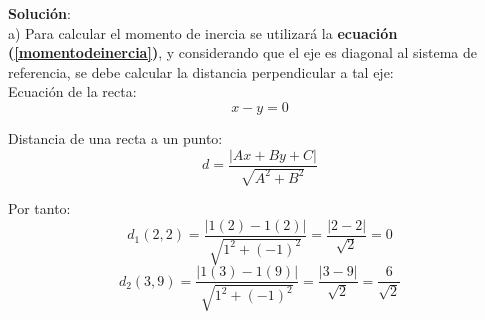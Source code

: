 \documentclass[letter,twoside,11pt]{article}
\begin{document}
\begin{minipage}[b]{.9\linewidth}
\textbf{Solución}:\\
a) Para calcular el momento de inercia se utilizará la \textbf{ecuación
(\ref{momentodeinercia})}, y considerando que el eje es diagonal al sistema de
referencia, se debe calcular la distancia perpendicular a tal eje: \\

Ecuación de la recta:
\begin{equation*}
    x - y = 0
\end{equation*}

Distancia de una recta a un punto:
\begin{equation*}
    d = \frac{| A x + B y + C |}{\sqrt{A^2 + B^2}}
\end{equation*}

Por tanto: \\
\begin{equation*}
    d_1(2,2) = \frac{| 1 (2) - 1 (2) |}{\sqrt{1^2 + (-1)^2}} = \frac{|2 - 2|}{\sqrt{2}} = 0
\end{equation*}
\begin{equation*}
    d_2(3,9) = \frac{| 1 (3) - 1 (9) |}{\sqrt{1^2 + (-1)^2}} = \frac{|3 - 9|}{\sqrt{2}} = \frac{6}{\sqrt{2}}
\end{equation*}
\end{minipage}
\end{document}
